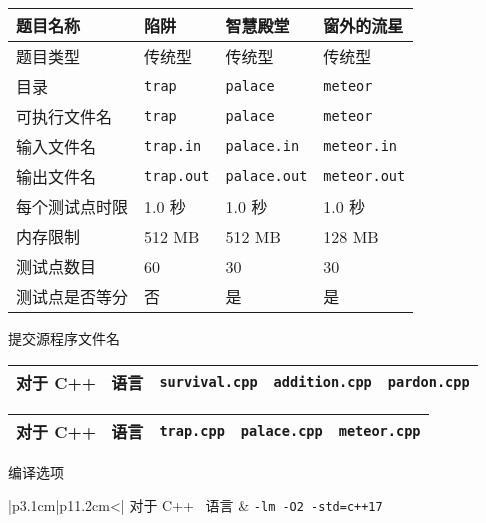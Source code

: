 \documentclass[UTF8,a4paper]{ctexart}
\begin{document}
    \begin{center}
        \begin{tabular}{|p{4cm}|p{3.2cm}|p{3.2cm}|p{3.2cm}|}
        \hline
        题目名称 & 陷阱 & 智慧殿堂 & 窗外的流星 \\
        \hline
        题目类型 & 传统型 & 传统型 & 传统型 \\
        \hline
        目录 & \texttt{trap} & \texttt{palace} & \texttt{meteor} \\
        \hline
        可执行文件名 & \texttt{trap} & \texttt{palace} & \texttt{meteor} \\
        \hline
        输入文件名 & \texttt{trap.in} & \texttt{palace.in} & \texttt{meteor.in} \\
        \hline
        输出文件名 & \texttt{trap.out} & \texttt{palace.out} & \texttt{meteor.out} \\
        \hline
        每个测试点时限 & 1.0 秒 & 1.0 秒 & 1.0 秒 \\
        \hline
        内存限制 & 512 MB & 512 MB & 128 MB \\
        \hline
        测试点数目 & 60 & 30 &30 \\
        \hline
        测试点是否等分 & 否 & 是 & 是 \\
        \hline
        \end{tabular}
    \end{center}
提交源程序文件名
    \begin{center}
        \begin{tabular}{|p{4cm}|p{3.2cm}|p{3.2cm}|p{3.2cm}|}
        \hline
        对于 C++ \  语言 & \texttt{survival.cpp} & \texttt{addition.cpp} & \texttt{pardon.cpp} \\
        \hline
        \end{tabular}
    \end{center}
    \begin{center}
        \begin{tabular}{|p{4cm}|p{3.2cm}|p{3.2cm}|p{3.2cm}|}
        \hline
        对于 C++ \  语言 & \texttt{trap.cpp} & \texttt{palace.cpp} & \texttt{meteor.cpp} \\
        \hline
        \end{tabular}
    \end{center}
编译选项
    \begin{center}
        \begin{tabular}{|p{3.1cm}|p{11.2cm}<\centering|}
        \hline
        对于 C++ \ 语言 & \texttt{-lm -O2 -std=c++17} \\
        \hline
        \end{tabular}
    \end{center}
\end{document}
